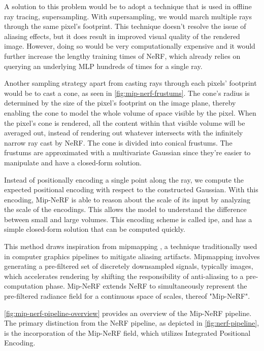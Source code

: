 A solution to this problem would be to adopt a technique that is used in offline ray tracing, supersampling. With supersampling, we would march multiple rays through the same pixel's footprint. This technique doesn't resolve the issue of aliasing effects, but it does result in improved visual quality of the rendered image. However, doing so would be very computationally expensive and it would further increase the lengthy training times of NeRF, which already relies on querying an underlying MLP hundreds of times for a single ray.

Another sampling strategy apart from casting rays through each pixels' footprint would be to cast a cone, as seen in \autoref{fig:mip-nerf-frustums}. The cone's radius is determined by the size of the pixel's footprint on the image plane, thereby enabling the cone to model the whole volume of space visible by the pixel. When the pixel's cone is rendered, all the content within that visible volume will be averaged out, instead of rendering out whatever intersects with the infinitely narrow ray cast by NeRF. The cone is divided into conical frustums. The frustums are approximated with a multivariate Gaussian since they're easier to manipulate and have a closed-form solution.



Instead of positionally encoding a single point along the ray, we compute the expected positional encoding with respect to the 
constructed Gaussian. With this encoding, Mip-NeRF is able to reason about the scale of its input by analyzing the scale of the encodings. This allows the model to understand the difference between small and large volumes. This encoding scheme is called \acrfull{ipe}, and has a simple closed-form solution that can be computed quickly.

This method draws inspiration from mipmapping \cite{williams1983pyramidal}, a technique traditionally used in computer graphics pipelines to mitigate aliasing artifacts. Mipmapping involves generating a pre-filtered set of discretely downsampled signals, typically images, which accelerates rendering by shifting the responsibility of anti-aliasing to a pre-computation phase. Mip-NeRF extends NeRF to simultaneously represent the pre-filtered radiance field for a continuous space of scales, thereof "Mip-NeRF".

\autoref{fig:mip-nerf-pipeline-overview} provides an overview of the Mip-NeRF pipeline. The primary distinction from the NeRF pipeline, as depicted in \autoref{fig:nerf-pipeline}, is the incorporation of the Mip-NeRF field, which utilizes Integrated Positional Encoding.

